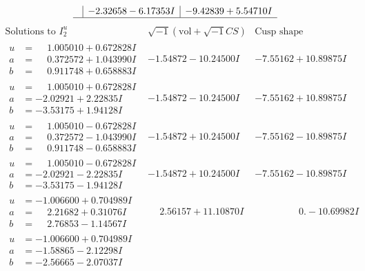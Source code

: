 \documentclass[1p]{elsarticle_modified}
\theoremstyle{definition}
\newcommand{\I}{\sqrt{-1}}
\begin{document}
$$\begin{array}{c|c|c}
 & -2.32658 - 6.17353 I & -9.42839 + 5.54710 I\\
 \hline 
 \end{array}$$\newpage$$\begin{array}{c|c|c}  
\text{Solutions to }I^u_{2}& \I (\text{vol} + \sqrt{-1}CS) & \text{Cusp shape}\\
 \hline 
\begin{aligned}
u &= \phantom{-}1.005010 + 0.672828 I \\
a &= \phantom{-}0.372572 + 1.043990 I \\
b &= \phantom{-}0.911748 + 0.658883 I\end{aligned}
 & -1.54872 - 10.24500 I & -7.55162 + 10.89875 I \\ \hline\begin{aligned}
u &= \phantom{-}1.005010 + 0.672828 I \\
a &= -2.02921 + 2.22835 I \\
b &= -3.53175 + 1.94128 I\end{aligned}
 & -1.54872 - 10.24500 I & -7.55162 + 10.89875 I \\ \hline\begin{aligned}
u &= \phantom{-}1.005010 - 0.672828 I \\
a &= \phantom{-}0.372572 - 1.043990 I \\
b &= \phantom{-}0.911748 - 0.658883 I\end{aligned}
 & -1.54872 + 10.24500 I & -7.55162 - 10.89875 I \\ \hline\begin{aligned}
u &= \phantom{-}1.005010 - 0.672828 I \\
a &= -2.02921 - 2.22835 I \\
b &= -3.53175 - 1.94128 I\end{aligned}
 & -1.54872 + 10.24500 I & -7.55162 - 10.89875 I \\ \hline\begin{aligned}
u &= -1.006600 + 0.704989 I \\
a &= \phantom{-}2.21682 + 0.31076 I \\
b &= \phantom{-}2.76853 - 1.14567 I\end{aligned}
 & \phantom{-}2.56157 + 11.10870 I & \phantom{-0.000000 } 0. - 10.69982 I \\ \hline\begin{aligned}
u &= -1.006600 + 0.704989 I \\
a &= -1.58865 - 2.12298 I \\
b &= -2.56665 - 2.07037 I\end{aligned}

\end{array}$$
\end{document}
